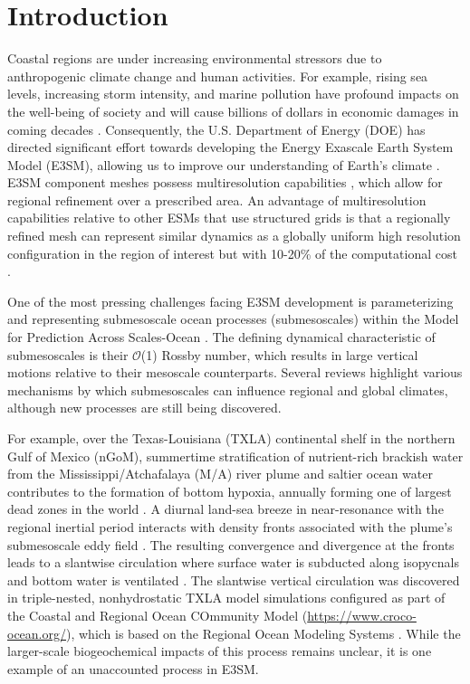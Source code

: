 \section{Introduction}
Coastal regions are under increasing environmental stressors due to anthropogenic climate change and human activities. For example, rising sea levels, increasing storm intensity, and marine pollution have profound impacts on the well-being of society and will cause billions of dollars in economic damages in coming decades \citep{RN23}. Consequently, the U.S. Department of Energy (DOE) has directed significant effort towards developing the Energy Exascale Earth System Model (E3SM), allowing us to improve our understanding of Earth's climate \citep{golaz2022doe}. E3SM component meshes possess multiresolution capabilities \citep{ringler2008multiresolution}, which allow for regional refinement over a prescribed area. An advantage of multiresolution capabilities relative to other ESMs that use structured grids \citep[e.g., the Community Earth System Model, ][]{danabasoglu2020community} is that a regionally refined mesh can represent similar dynamics as a globally uniform high resolution configuration in the region of interest but with 10-20\% of the computational cost \citep{tang2023fully}. 

One of the most pressing challenges facing E3SM development is parameterizing and representing submesoscale ocean processes (submesoscales) within the Model for Prediction Across Scales-Ocean \citep[MPAS-O,][]{ringler2013multi}. The defining dynamical characteristic of submesoscales is their $\mathcal{O}$(1) Rossby number, which results in large vertical motions relative to their mesoscale counterparts. Several reviews \citep{McWilliams_2016,mcwilliams2019survey,taylor2023submesoscale} highlight various mechanisms by which submesoscales can influence regional and global climates, although new processes are still being discovered. 

For example, over the Texas-Louisiana (TXLA) continental shelf in the northern Gulf of Mexico (nGoM), summertime stratification of nutrient-rich brackish water from the Mississippi/Atchafalaya (M/A) river plume and saltier ocean water contributes to the formation of bottom hypoxia, annually forming one of largest dead zones in the world \citep{bianchi2010science, ruiz2021small}. A diurnal land-sea breeze in near-resonance with the regional inertial period interacts with density fronts associated with the plume’s submesoscale eddy field \citep{Hetland_2017, Kobashi_2020}. The resulting convergence and divergence at the fronts leads to a slantwise circulation where surface water is subducted along isopycnals and bottom water is ventilated \citep{qu2022rapid}. The slantwise vertical circulation was discovered in triple-nested, nonhydrostatic TXLA model simulations configured as part of the Coastal and Regional Ocean COmmunity Model (\url{https://www.croco-ocean.org/}), which is based on the Regional Ocean Modeling Systems \citep[ROMS, ]{shchepetkin2005regional}. While the larger-scale biogeochemical impacts of this process remains unclear, it is one example of an unaccounted process in E3SM. 


